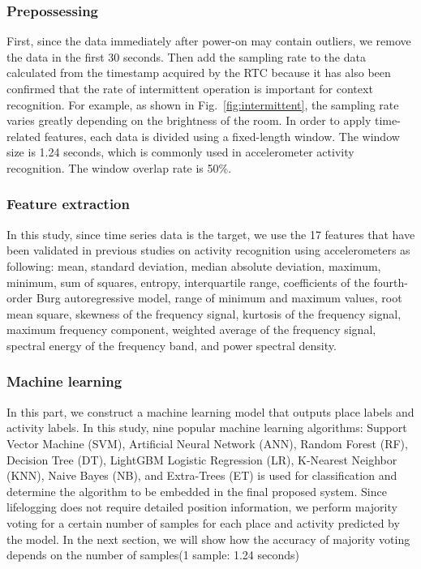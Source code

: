 \documentclass[conference]{IEEEtran}
\begin{document}
\subsubsection{Prepossessing}
First, since the data immediately after power-on may contain outliers, we remove the data in the first 30 seconds.
Then add the sampling rate to the data calculated from the timestamp acquired by the RTC because it has also been confirmed that the rate of intermittent operation is important for context recognition\cite{lan2017capsense,lan2020capacitor}.
For example, as shown in Fig.~\ref{fig:intermittent}, the sampling rate varies greatly depending on the brightness of the room.
In order to apply time-related features, each data is divided using a fixed-length window. The window size is 1.24 seconds\cite{torigoe2020strike, nakamura2019waistonbelt}, which is commonly used in accelerometer activity recognition.
The window overlap rate is 50\%.

\subsubsection{Feature extraction}
In this study, since time series data is the target, we use the 17 features that have been validated in previous studies\cite{torigoe2020strike,nakamura2019waistonbelt} on activity recognition using accelerometers as following: mean, standard deviation, median absolute deviation, maximum, minimum, sum of squares, entropy, interquartile range, coefficients of the fourth-order Burg autoregressive model, range of minimum and maximum values, root mean square, skewness of the frequency signal, kurtosis of the frequency signal, maximum frequency component, weighted average of the frequency signal, spectral energy of the frequency band, and power spectral density.

\subsubsection{Machine learning}
In this part, we construct a machine learning model that outputs place labels and activity labels.
In this study, nine popular machine learning algorithms: Support Vector Machine (SVM), Artificial Neural Network (ANN), Random Forest (RF), Decision Tree (DT), LightGBM Logistic Regression (LR), K-Nearest Neighbor (KNN), Naive Bayes (NB), and Extra-Trees (ET) is used for classification and determine the algorithm to be embedded in the final proposed system.
Since lifelogging does not require detailed position information, we perform majority voting for a certain number of samples for each place and activity predicted by the model.
In the next section, we will show how the accuracy of majority voting depends on the number of samples(1 sample: 1.24 seconds)
\end{document}
